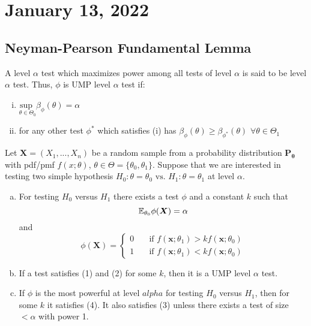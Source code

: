 \section{January 13, 2022}
\subsection{Neyman-Pearson Fundamental Lemma}

\begin{definition}
    A level $\alpha$ test which maximizes power among all tests of level $\alpha$ is said to be   level $\alpha$ test. Thus, $\phi$ is UMP level $\alpha$ test if:
    \begin{enumerate}[(i)]
        \item $\underset{\theta \in \Theta_{0}}{\text{sup }} \beta_{\phi}(\theta) = \alpha$
        \item for any other test $\phi^*$ which satisfies (i) has $\beta_{\phi}(\theta) \geq \beta_{\phi^*}(\theta)$  $\forall \theta \in \Theta_{1} $ 
        
    \end{enumerate}
\end{definition}

\begin{theorem}
Let $\boldsymbol{X} = (X_1,...,X_n)$ be a random sample from a probability distribution $\boldsymbol{P_{\theta}}$ with pdf/pmf $f(x;\theta)$, $\theta \in \Theta = \{\theta_0, \theta_1\}$. Suppose that we are interested in testing two simple hypothesis 
$
H_0: \theta = \theta_0 \text{ vs. } H_1:\theta = \theta_1
$
at level $\alpha$.
\begin{enumerate}[(a)]
    \item For testing $H_0$ versus $H_1$ there exists a test $\phi$ and a constant $k$ such that 
    \begin{equation}
        \mathbb E_{\theta_{0}}\phi(\boldsymbol{X}) = \alpha
    \end{equation}
    and
    \begin{equation}
    \phi(\boldsymbol{X}) = 
    \begin{cases}
     0 \quad& \text{if } f( \boldsymbol{x};\theta_1) > kf( \boldsymbol{x}; \theta_0) \\
    1 & \text{if } f( \boldsymbol{x}; \theta_1) < kf( \boldsymbol{x}; \theta_0)
    \end{cases}
    \end{equation}
    \item If a test satisfies (1) and (2) for some $k$, then it is a UMP level $\alpha$ test. 
    \item If $\phi$ is the most powerful at level $alpha$ for testing $H_0$ versus $H_1$, then for some $k$ it satisfies (4). It also satisfies (3) unless there exists a test of size $< \alpha$ with power 1.
\end{enumerate}
\end{theorem}